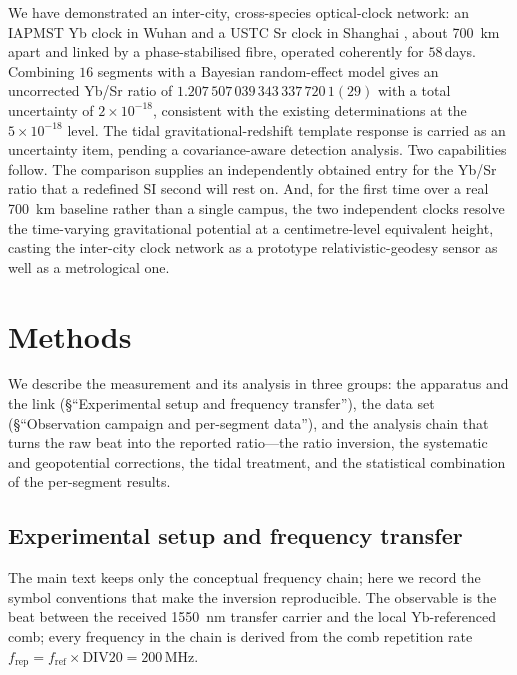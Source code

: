 \documentclass[11pt,a4paper]{article}
\newcommand{\e}[1]{\times 10^{#1}}
\begin{document}
We have demonstrated an inter-city, cross-species optical-clock network:
an IAPMST Yb clock in Wuhan \citep{zhu2026yb} and a USTC Sr clock in
Shanghai \citep{jia2026sr}, about \qty{700}{km} apart and linked by a
phase-stabilised fibre, operated coherently for $58$\,days. Combining
$16$ segments with a Bayesian random-effect model gives an uncorrected
Yb/Sr ratio of $1.207\,507\,039\,343\,337\,720\,1(29)$ with a total
uncertainty of $2\e{-18}$, consistent with the existing determinations at
the $5\e{-18}$ level. The tidal gravitational-redshift template response is
carried as an uncertainty item, pending a covariance-aware detection analysis.
Two capabilities follow. The comparison supplies an independently
obtained entry for the Yb/Sr ratio that a redefined SI second will rest
on. And, for the first time over a real \qty{700}{km} baseline rather than a
single campus, the two independent clocks resolve the time-varying
gravitational potential at a centimetre-level equivalent height, casting
the inter-city clock network as a prototype relativistic-geodesy sensor
as well as a metrological one.

\section{Methods}

We describe the measurement and its analysis in three groups: the
apparatus and the link (§``Experimental setup and frequency transfer''),
the data set (§``Observation campaign and per-segment data''), and the
analysis chain that turns the raw beat into the reported ratio---the
ratio inversion, the systematic and geopotential corrections, the tidal
treatment, and the statistical combination of the per-segment results.

\subsection{Experimental setup and frequency transfer}

The main text keeps only the conceptual frequency chain; here we record
the symbol conventions that make the inversion reproducible. The
observable is the beat between the received \qty{1550}{nm} transfer carrier
and the local Yb-referenced comb; every frequency in the chain is derived
from the comb repetition rate $f_{\mathrm{rep}} =
f_{\mathrm{ref}}\times\mathrm{DIV20} = 200$\,MHz.
\end{document}

